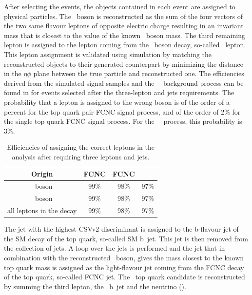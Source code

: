 %
After selecting the events,  the objects contained in each event are assigned to physical particles.  The \PZ\ boson is reconstructed as the sum of the four vectors of the two same flavour leptons of opposite electric charge resulting in an invariant mass that is closest to the value of the known \PZ\ boson mass. The third remaining lepton is assigned to the lepton coming from the \PW\ boson decay, so-called \PW\ lepton. This lepton assignment is  validated using simulation by matching the reconstructed objects to their generated counterpart by minimizing  the distance in the  $\eta\phi$ plane between the true particle and reconstructed one. The efficiencies derived from the simulated signal samples and the \SM\ \tZq\ background process can be found in  for events selected after the three-lepton and jets requirements. The probability that a lepton is assigned to the wrong boson is of the order of a percent for the top quark pair FCNC signal process, and of the order of 2\% for the single top quark FCNC signal process. For the \SM\ \tZq\ process, this probability is 3\%.
\begin{table}[htbp]
	\centering
	\caption{Efficiencies of assigning the correct leptons in the analysis after requiring three leptons and jets.}
	\begin{tabular}{cccc}
		\toprule 
		Origin & FCNC \tZq  & FCNC \tZ & \SM\ \tZq \\ 
		\midrule
		\PW\ boson & 99\% & 98\% & 97\% \\ 
	
		\PZ\ boson  & 99\% & 98\% & 97\% \B\\ 
		 \hdashline
		all leptons in the decay & 99\% & 98\% & 97\% \T \\ 
		\bottomrule
	\end{tabular} 
	\label{tab:matching}
\end{table}

The jet with the highest CSVv2 discriminant is assigned to the b-flavour jet of the SM decay of the top quark, so-called SM b~jet. This jet is then removed from the collection of jets. A loop over the jets is performed and the jet that in combination with the reconstructed \PZ\ boson, gives the mass closest to the known top quark mass is assigned as the light-flavour jet coming from the FCNC decay of the top quark, so-called FCNC jet. The \SM\ top quark candidate is reconstructed by summing the third lepton, the \SM\ b~jet and the neutrino (\Etmis). 

